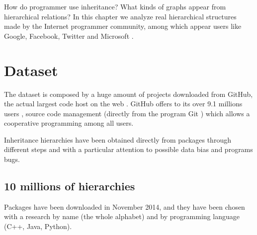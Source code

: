 How do programmer use inheritance? What kinds of graphs appear from hierarchical relations? In this chapter we analyze real hierarchical structures made by the Internet programmer community, among which appear users like Google, Facebook, Twitter and Microsoft \cite{gitwir}.
\section{Dataset}
The dataset is composed by a huge amount of projects downloaded from GitHub, the actual largest code host on the web \cite{gitworld}. GitHub offers to its over 9.1 millions users \cite{gitpac}, source code management (directly from the program Git \cite{git}) which allows a cooperative programming among all users.

Inheritance hierarchies have been obtained directly from packages through different steps and with a particular attention to possible data bias and programs bugs.

\subsection{10 millions of hierarchies}
Packages have been downloaded in November 2014, and they have been chosen with a research by name (the whole alphabet) and by programming language (C++, Java, Python).

